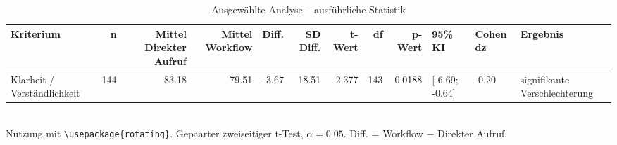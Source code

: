 \begin{table}
\centering
\caption{Ausgewählte Analyse -- ausführliche Statistik}
\begin{tabular}{lrrrrrrrrlll}
\toprule
Kriterium & n & Mittel Direkter Aufruf & Mittel Workflow & Diff. & SD Diff. & t-Wert & df & p-Wert & 95\% KI & Cohen dz & Ergebnis \\
\midrule
Klarheit / Verständlichkeit & 144 & 83.18 & 79.51 & -3.67 & 18.51 & -2.377 & 143 & 0.0188 & [-6.69; -0.64] & -0.20 & signifikante Verschlechterung \\
\bottomrule
\end{tabular}
\\[2mm]
\footnotesize Nutzung mit \texttt{\textbackslash usepackage\{rotating\}}. Gepaarter zweiseitiger t-Test, $\alpha=0.05$. Diff. = Workflow $-$ Direkter Aufruf.
\end{table}
